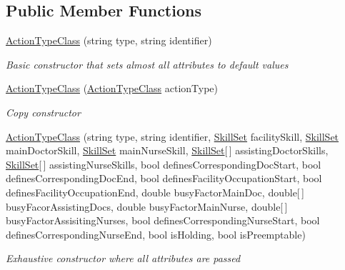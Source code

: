 \subsection*{Public Member Functions}
\begin{DoxyCompactItemize}
\item 
\hyperlink{class_general_health_care_elements_1_1_general_classes_1_1_action_types_and_paths_1_1_action_type_class_a209429b1341bfca569c3638d222b2bc8}{Action\+Type\+Class} (string type, string identifier)
\begin{DoxyCompactList}\small\item\em Basic constructor that sets almost all attributes to default values \end{DoxyCompactList}\item 
\hyperlink{class_general_health_care_elements_1_1_general_classes_1_1_action_types_and_paths_1_1_action_type_class_aee8e4a2aecaf010f45727f2209bd28f4}{Action\+Type\+Class} (\hyperlink{class_general_health_care_elements_1_1_general_classes_1_1_action_types_and_paths_1_1_action_type_class}{Action\+Type\+Class} action\+Type)
\begin{DoxyCompactList}\small\item\em Copy constructor \end{DoxyCompactList}\item 
\hyperlink{class_general_health_care_elements_1_1_general_classes_1_1_action_types_and_paths_1_1_action_type_class_ab445670b1e664ae8a84416261009453a}{Action\+Type\+Class} (string type, string identifier, \hyperlink{class_simulation_core_1_1_h_c_c_m_elements_1_1_skill_set}{Skill\+Set} facility\+Skill, \hyperlink{class_simulation_core_1_1_h_c_c_m_elements_1_1_skill_set}{Skill\+Set} main\+Doctor\+Skill, \hyperlink{class_simulation_core_1_1_h_c_c_m_elements_1_1_skill_set}{Skill\+Set} main\+Nurse\+Skill, \hyperlink{class_simulation_core_1_1_h_c_c_m_elements_1_1_skill_set}{Skill\+Set}\mbox{[}$\,$\mbox{]} assisting\+Doctor\+Skills, \hyperlink{class_simulation_core_1_1_h_c_c_m_elements_1_1_skill_set}{Skill\+Set}\mbox{[}$\,$\mbox{]} assisting\+Nurse\+Skills, bool defines\+Corresponding\+Doc\+Start, bool defines\+Corresponding\+Doc\+End, bool defines\+Facility\+Occupation\+Start, bool defines\+Facility\+Occupation\+End, double busy\+Factor\+Main\+Doc, double\mbox{[}$\,$\mbox{]} busy\+Facor\+Assisting\+Docs, double busy\+Factor\+Main\+Nurse, double\mbox{[}$\,$\mbox{]} busy\+Factor\+Assisiting\+Nurses, bool defines\+Corresponding\+Nurse\+Start, bool defines\+Corresponding\+Nurse\+End, bool is\+Holding, bool is\+Preemptable)
\begin{DoxyCompactList}\small\item\em Exhaustive constructor where all attributes are passed \end{DoxyCompactList}\end{DoxyCompactItemize}
